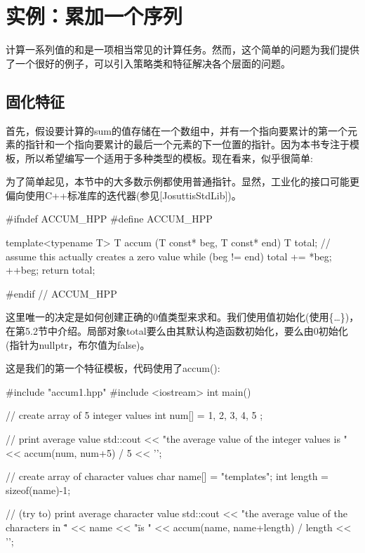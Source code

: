 \section{实例：累加一个序列}

计算一系列值的和是一项相当常见的计算任务。然而，这个简单的问题为我们提供了一个很好的例子，可以引入策略类和特征解决各个层面的问题。

\subsection{固化特征}

首先，假设要计算的sum的值存储在一个数组中，并有一个指向要累计的第一个元素的指针和一个指向要累计的最后一个元素的下一位置的指针。因为本书专注于模板，所以希望编写一个适用于多种类型的模板。现在看来，似乎很简单:

\begin{notice}
为了简单起见，本节中的大多数示例都使用普通指针。显然，工业化的接口可能更偏向使用C++标准库的迭代器(参见[JosuttisStdLib])。
\end{notice}

\begin{cpp}
#ifndef ACCUM_HPP
#define ACCUM_HPP

template<typename T>
T accum (T const* beg, T const* end)
{
	T total{}; // assume this actually creates a zero value
	while (beg != end) {
		total += *beg;
		++beg;
	}
	return total;
}

#endif // ACCUM_HPP
\end{cpp}

这里唯一的决定是如何创建正确的0值类型来求和。我们使用值初始化(使用\{…\})，在第5.2节中介绍。局部对象total要么由其默认构造函数初始化，要么由0初始化(指针为nullptr，布尔值为false)。

这是我们的第一个特征模板，代码使用了accum():

\begin{cpp}
#include "accum1.hpp"
#include <iostream>
int main()
{
	// create array of 5 integer values
	int num[] = { 1, 2, 3, 4, 5 };
	
	// print average value
	std::cout << "the average value of the integer values is "
			  << accum(num, num+5) / 5
			  << '\n';
			  
	// create array of character values
	char name[] = "templates";
	int length = sizeof(name)-1;
	
	// (try to) print average character value
	std::cout << "the average value of the characters in \""
			  << name << "\" is "
			  << accum(name, name+length) / length
			  << '\n';
}
\end{cpp}

